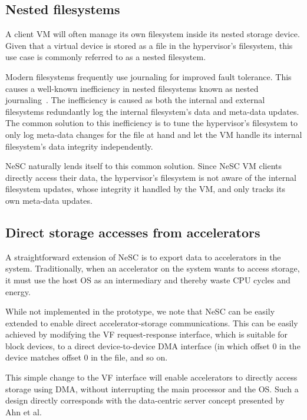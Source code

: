 \subsection*{Nested filesystems}
A client VM will often manage its own filesystem inside its nested storage device. Given that a virtual device is stored as a file in the hypervisor's filesystem, this use case is commonly referred to as a nested filesystem.

Modern filesystems frequently use journaling for improved fault tolerance. This causes a well-known inefficiency in nested filesystems known as nested journaling~\cite{le12nested}. The inefficiency is caused as both the internal and external filesystems redundantly log the internal filesystem's data and meta-data updates. The common solution to this inefficiency is to tune the hypervisor's filesystem to only log meta-data changes for the file at hand and let the VM handle its internal filesystem's data integrity independently.

NeSC naturally lends itself to this common solution. Since NeSC VM clients directly access their data, the hypervisor's filesystem is not aware of the internal filesystem updates, whose integrity it handled by the VM, and only tracks its own meta-data updates.

\subsection*{Direct storage accesses from accelerators}

A straightforward extension of NeSC is to export data to accelerators in the system.
Traditionally, when an accelerator on the system wants to access storage, it must use the host OS as an intermediary and thereby waste CPU cycles and energy.

While not implemented in the prototype, we note that NeSC can be easily extended to enable direct accelerator-storage communications. This can be easily achieved by modifying the VF request-response interface, which is suitable for block devices, to a direct device-to-device DMA interface (in which offset 0 in the device matches offset 0 in the file, and so on.

This simple change to the VF interface will enable accelerators to directly access storage using DMA, without interrupting the main processor and the OS. Such a design directly corresponds with the data-centric server concept presented by Ahn et al.~\cite{ahn2015dcs}
